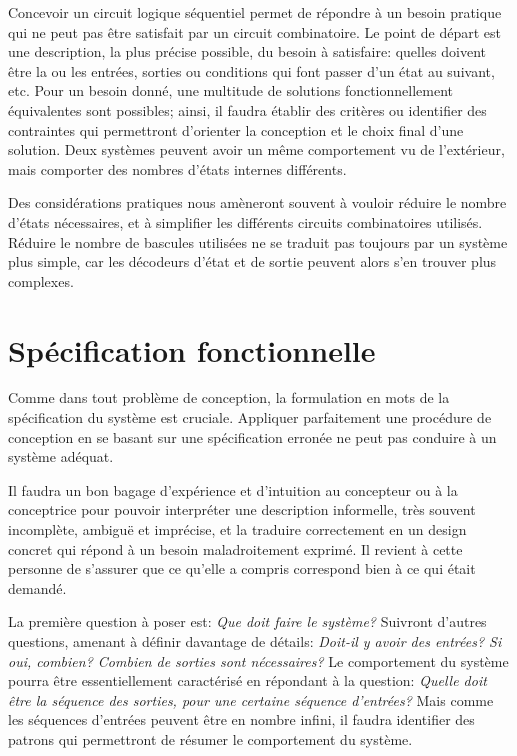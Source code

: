 \documentclass[letter, oneside]{book}
\begin{document}
Concevoir un circuit logique séquentiel permet de répondre à un besoin
pratique qui ne peut pas être satisfait par un circuit combinatoire.
Le point de départ est une description, la plus précise possible, du
besoin à satisfaire: quelles doivent être la ou les entrées, sorties
ou conditions qui font passer d'un état au suivant, etc. Pour un
besoin donné, une multitude de solutions fonctionnellement
équivalentes sont possibles; ainsi, il faudra établir des critères ou
identifier des contraintes qui permettront d'orienter la conception et
le choix final d'une solution. Deux systèmes peuvent avoir un même
comportement vu de l'extérieur, mais comporter des nombres d'états
internes différents.

Des considérations pratiques nous amèneront souvent à vouloir réduire
le nombre d'états nécessaires, et à simplifier les différents circuits
combinatoires utilisés. Réduire le nombre de bascules utilisées ne se
traduit pas toujours par un système plus simple, car les décodeurs
d'état et de sortie peuvent alors s'en trouver plus complexes.

\section{Spécification fonctionnelle}
\label{sec:org9a6f99e}

Comme dans tout problème de conception, la formulation en mots de la
spécification du système est cruciale. Appliquer parfaitement une
procédure de conception en se basant sur une spécification erronée ne
peut pas conduire à un système adéquat.

Il faudra un bon bagage d'expérience et d'intuition au concepteur ou à
la conceptrice pour pouvoir interpréter une description informelle,
très souvent incomplète, ambiguë et imprécise, et la traduire
correctement en un design concret qui répond à un besoin
maladroitement exprimé. Il revient à cette personne de s'assurer que
ce qu'elle a compris correspond bien à ce qui était demandé.

La première question à poser est: \emph{Que doit faire le système?}
Suivront d'autres questions, amenant à définir davantage de détails:
\emph{Doit-il y avoir des entrées? Si oui, combien? Combien de sorties sont
nécessaires?} Le comportement du système pourra être essentiellement
caractérisé en répondant à la question: \emph{Quelle doit être la séquence
des sorties, pour une certaine séquence d'entrées?} Mais comme les
séquences d'entrées peuvent être en nombre infini, il faudra
identifier des patrons qui permettront de résumer le comportement du
système.
\end{document}
